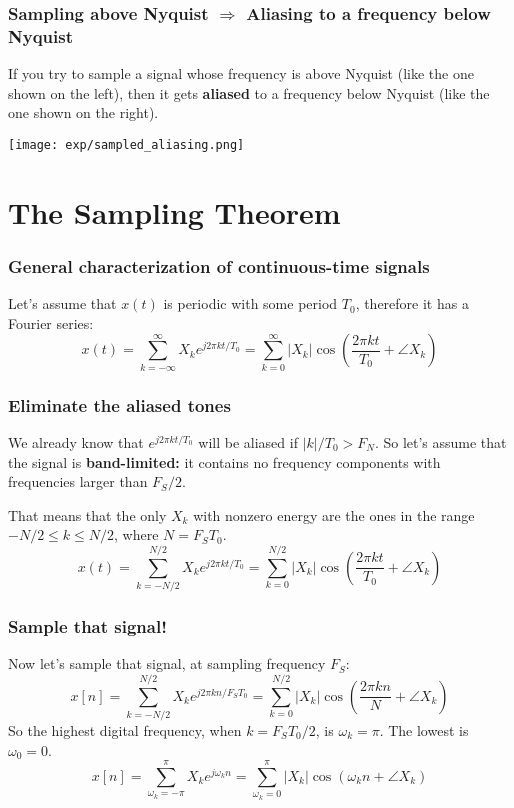 \documentclass{beamer}
\begin{document}
\begin{frame}
  \frametitle{Sampling above Nyquist $\Rightarrow$ Aliasing to a frequency below Nyquist}

  If you try to sample a signal whose frequency is above Nyquist (like
  the one shown on the left), then it gets {\bf aliased} to a frequency below Nyquist
  (like the one shown on the right).
  \centerline{\texttt{[image: exp/sampled\_aliasing.png]}}
\end{frame}


\section[The Sampling Theorem]{The Sampling Theorem}
\setcounter{subsection}{1}

\begin{frame}
  \frametitle{General characterization of continuous-time signals}

  Let's assume that $x(t)$ is periodic with some period $T_0$,
  therefore it has a Fourier series:
  \[
  x(t) = \sum_{k=-\infty}^\infty X_k e^{j2\pi kt/T_0}
  = \sum_{k=0}^\infty |X_k|\cos\left(\frac{2\pi kt}{T_0}+\angle X_k\right)
  \]
\end{frame}

\begin{frame}
  \frametitle{Eliminate the aliased tones}

  We already know that $e^{j2\pi kt/T_0}$ will be aliased if $|k|/T_0 >
  F_N$.  So let's assume that the signal is {\bf band-limited:} it
  contains no frequency components with frequencies larger than $F_S/2$.

  That means that the only $X_k$ with nonzero energy are the ones in
  the range $-N/2\le k\le N/2$, where $N=F_ST_0$.
  \[
  x(t) = \sum_{k=-N/2}^{N/2} X_k e^{j2\pi kt/T_0}
  = \sum_{k=0}^{N/2} |X_k|\cos\left(\frac{2\pi kt}{T_0}+\angle X_k\right)
  \]
\end{frame}

\begin{frame}
  \frametitle{Sample that signal!}

  Now let's sample that signal, at sampling frequency $F_S$:
  \[
  x[n] = \sum_{k=-N/2}^{N/2} X_k e^{j2\pi k n/F_ST_0}
  = \sum_{k=0}^{N/2} |X_k|\cos\left(\frac{2\pi kn}{N}+\angle X_k\right)
  \]
  So the highest digital frequency, when $k=F_ST_0/2$, is
  $\omega_k=\pi$.  The lowest is $\omega_0=0$.  
  \[
  x[n] = \sum_{\omega_k=-\pi}^{\pi} X_k e^{j\omega_k n}
  = \sum_{\omega_k=0}^{\pi} |X_k|\cos\left(\omega_k n+\angle X_k\right)
  \]
\end{frame}
\end{document}
